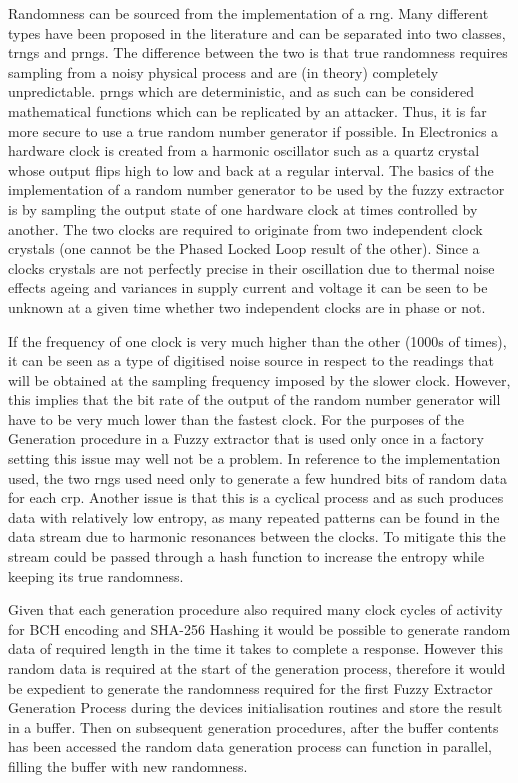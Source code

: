 Randomness can be sourced from the implementation of a \gls{rng}.
Many different types have been proposed in the literature and can be separated
into two classes, \glspl{trng} and \glspl{prng}.
The difference between the two is that true randomness requires sampling
from a noisy physical process and are (in theory) completely unpredictable.
\Glspl{prng} which are deterministic, and as such
can be considered mathematical functions which can be replicated by an attacker.
Thus, it is far more secure to use a true random number generator if possible.
In Electronics a hardware clock is created from a harmonic oscillator such as a
quartz crystal whose output flips high to low and back at a regular interval.
The basics of the implementation of a random number generator to be used by the
fuzzy extractor is by sampling the output state of one hardware clock at times
controlled by another.
The two clocks are required to originate from two independent clock crystals
(one cannot be the Phased Locked Loop result of the other). Since a clocks
crystals are not perfectly precise in their oscillation due to thermal noise
effects ageing and variances in supply current and voltage it can be seen to be
unknown at a given time whether two independent clocks are in phase or not.

If the frequency of one clock is very much higher than the other (1000s of
times), it can be seen as a type of digitised noise source in respect to the
readings that will be obtained at the sampling frequency imposed by the slower
clock.
However, this implies that the bit rate of the output of the random number
generator will have to be very much lower than the fastest clock.
For the purposes of the Generation procedure in a Fuzzy extractor that is used
only once in a factory setting this issue may well not be a problem.
In reference to the implementation used, the two \glspl{rng} used
need only to generate a few hundred bits of random data for each \gls{crp}.
Another issue is that this is a cyclical process and as such produces data with
relatively low entropy, as many repeated patterns can be found in the data
stream due to harmonic resonances between the clocks.
To mitigate this the stream could be passed through a hash function to increase
the entropy while keeping its true randomness.

Given that each generation procedure also required many clock cycles of activity
for BCH encoding and SHA-256 Hashing it would be possible to generate random
data of required length in the time it takes to complete a response.
However this random data is required at the start of the generation process,
therefore it would be expedient to generate the randomness required for the
first Fuzzy Extractor Generation Process during the devices initialisation
routines and store the result in a buffer. Then on subsequent generation
procedures, after the buffer contents has been accessed the random data
generation process can function in parallel, filling the buffer with new
randomness.

